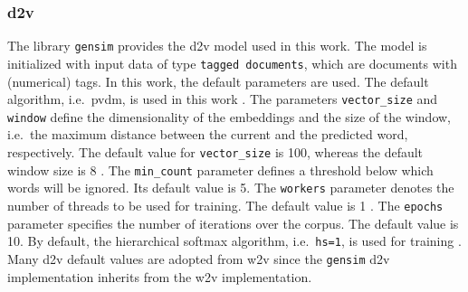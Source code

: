 \subsubsection*{\ac{d2v}}\label{subsubsec:impl-doc2vec}

The library \texttt{gensim} provides the \ac{d2v} model used in this work.
The model is initialized with input data of type \texttt{tagged documents}, which are documents with (numerical) tags.
In this work, the default parameters are used.
The default algorithm, i.e.\ \ac{pvdm}, is used in this work \cite{gensim-word2vec-init}.
The parameters \texttt{vector\_size} and \texttt{window} define the dimensionality of the embeddings and the size of the window, 
i.e.\ the maximum distance between the current and the predicted word, respectively.
The default value for \texttt{vector\_size} is 100, whereas the default window size is 8 \cite{gensim-word2vec-init, gensim-doc2vec-init}.
The \texttt{min\_count} parameter defines a threshold below which words will be ignored.
Its default value is 5.
The \texttt{workers} parameter denotes the number of threads to be used for training.
The default value is 1 \cite{gensim-word2vec-init}.
The \texttt{epochs} parameter specifies the number of iterations over the corpus.
The default value is 10.
By default, the hierarchical softmax algorithm, i.e.\ \texttt{hs=1}, is used for training \cite{gensim-doc2vec}.
Many \ac{d2v} default values are adopted from \ac{w2v} since the \texttt{gensim} \ac{d2v} implementation inherits from the \ac{w2v} implementation.
